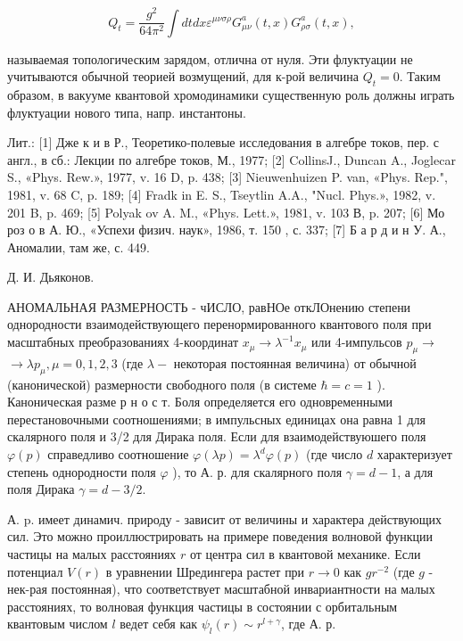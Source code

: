 \documentclass[10pt]{article}
\begin{document}
\[

Q_{t}=\frac{g^{2}}{64 \pi^{2}} \int d t d x \varepsilon^{\mu \nu \sigma \rho} G_{\mu \nu}^{a}(t, x) G_{\rho \sigma}^{a}(t, x),

\]



называемая топологическим зарядом, отлична от нуля. Эти флуктуации не учитываются обычной теорией возмущений, для к-рой величина $Q_{t}=0$. Таким образом, в вакууме квантовой хромодинамики существенную роль должны играть флуктуации нового типа, напр. инстантоны.



Лит.: [1] Дже к и в Р., Теоретико-полевые исследования в алгебре токов, пер. с англ., в сб.: Лекции по алгебре токов, М., 1977; [2] CollinsJ., Duncan A., Joglecar S., «Phys. Rew.», 1977, v. 16 D, p. 438; [3] Nieuwenhuizen P. van, «Phys. Rep.", 1981, v. 68 C, p. 189; [4] Fradk in E. S., Tseytlin A.A., "Nucl. Phys.», 1982, v. 201 B, p. 469; [5] Polyak ov A. M., «Phys. Lett.», 1981, v. 103 В, p. 207; [6] Мо роз о в А. Ю., «Успехи физич. наук», 1986, т. 150 , с. 337; [7] Б а р д и н У. А., Аномалии, там же, с. 449.



Д. И. Дьяконов.



АНОМАЛЬНАЯ РАЗМЕРНОСТЬ - чИСЛО, равНОе откЛОнению степени однородности взаимодействующего перенормированного квантового поля при масштабных преобразованиях 4-координат $x_{\mu} \rightarrow \lambda^{-1} x_{\mu}$ или 4-импульсов $p_{\mu} \rightarrow$ $\rightarrow \lambda p_{\mu}, \mu=0,1,2,3$ (где $\lambda-$ некоторая постоянная величина) от обычной (канонической) размерности свободного поля (в системе $\hbar=c=1$ ). Каноническая разме р н о с т. Боля определяется его одновременными перестановочными соотношениями; в импульсных единицах она равна 1 для скалярного поля и 3/2 для Дирака поля. Если для взаимодействуюшего поля $\varphi(p)$ справедливо соотношение $\varphi(\lambda p)=\lambda^{d} \varphi(p)$ (где число $d$ характеризует степень однородности поля $\varphi$ ), то А. р. для скалярного поля $\gamma=d-1$, а для поля Дирака $\gamma=d-3 / 2$.



А. p. имеет динамич. природу - зависит от величины и характера действующих сил. Это можно проиллюстрировать на примере поведения волновой функции частицы на малых расстояниях $r$ от центра сил в квантовой механике. Если потенциал $V(r)$ в уравнении Шредингера растет при $r \rightarrow 0$ как $g r^{-2}$ (где $g$ - нек-рая постоянная), что соответствует масштабной инвариантности на малых расстояниях, то волновая функция частицы в состоянии с орбитальным квантовым числом $l$ ведет себя как $\psi_{l}(r) \sim r^{l+\gamma}$, где А. р.
\end{document}
